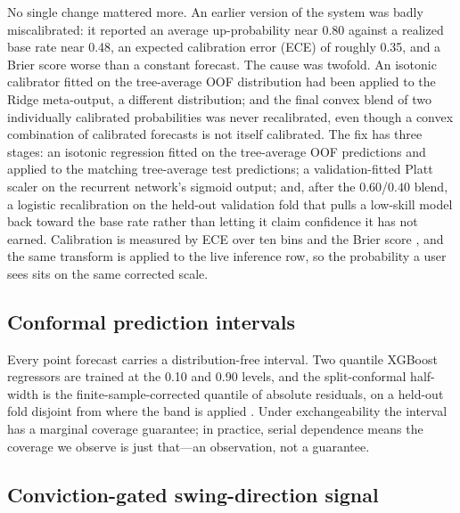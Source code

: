 \documentclass[12pt,a4paper]{article}
\begin{document}
No single change mattered more. An earlier version of the system was badly
miscalibrated: it reported an average up-probability near 0.80 against a realized
base rate near 0.48, an expected calibration error (ECE) of roughly 0.35, and a
Brier score worse than a constant forecast. The cause was twofold. An isotonic
calibrator fitted on the tree-average OOF distribution had been applied to the
Ridge meta-output, a different distribution; and the final convex blend of two
individually calibrated probabilities was never recalibrated, even though a convex
combination of calibrated forecasts is not itself calibrated. The fix has three
stages: an isotonic regression \cite{r_zadrozny} fitted on the tree-average OOF
predictions and applied to the matching tree-average test predictions; a
validation-fitted Platt scaler \cite{r_platt} on the recurrent network's sigmoid
output; and, after the $0.60$/$0.40$ blend, a logistic recalibration on the
held-out validation fold that pulls a low-skill model back toward the base rate
rather than letting it claim confidence it has not earned. Calibration is measured
by ECE over ten bins and the Brier score \cite{r_brier}, and the same transform is
applied to the live inference row, so the probability a user sees sits on the same
corrected scale.

\subsection{Conformal prediction intervals}

Every point forecast carries a distribution-free interval. Two quantile XGBoost
regressors are trained at the 0.10 and 0.90 levels, and the split-conformal
half-width is the finite-sample-corrected quantile of absolute residuals, on a
held-out fold disjoint from where the band is applied
\cite{r_romano,r_angelopoulos}. Under exchangeability the interval has a marginal
coverage guarantee; in practice, serial dependence means the coverage we observe is
just that---an observation, not a guarantee.

\subsection{Conviction-gated swing-direction signal}
\end{document}
